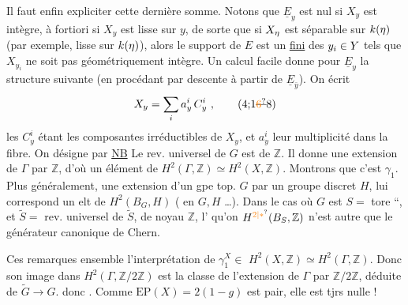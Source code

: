 Il faut enfin expliciter cette dernière somme. Notons que $\underline E_y$  est nul si $X_y$ est  intègre, à fortiori si $X_y$ est lisse sur $y$, de sorte que si $X_{\eta}$ est séparable sur $k(\eta)$ (par exemple, lisse sur $k(\eta)$), alors le support de $E$ est un  \uline{fini} des $y_i\in Y$ tels que $X_{y_i}$ ne soit pas géométriquement intègre. Un calcul facile donne pour $\underline E_y$ la structure suivante (en procédant par descente à partir de $\underline E_{\bar y}$). On écrit 
\[
X_y=\handwritten{\sum}_{i} a_y^i\,C_y^i\ ,
\tag*{(4;1\deleted{\unsure{6}}\handwritten8)}
\]
les $C_y^i$ étant les composantes irréductibles de $X_y$, et $a_y^i$ leur multiplicité dans la fibre. On désigne par
\uline{NB} Le rev. universel de $G$ est de  $\mathbb Z$. Il donne une extension  de $\Gamma$ par $\mathbb Z$, d'où un élément de $H^2(\Gamma,\mathbb Z)\simeq H^2(X,\mathbb Z)$. Montrons que c'est $\gamma_1$. Plus généralement,  une extension d'un gpe top. $G$ par un groupe discret $H$, lui correspond un elt de $H^2(B_G,H)$ ( en $G,H$ \ldots).
Dans le cas où $G$ est $S=$ tore ``, et $\widetilde S=$ rev. universel de $\widetilde S$, de noyau $\mathbb Z$, l' qu'on   $H^{\unsure{2|*}}(B_S,\mathbb Z)$ n'est autre que le générateur canonique de Chern.

Ces remarques ensemble   l'interprétation  de $\gamma_1^X\in$  $H^2(X,\mathbb Z)\simeq H^2(\Gamma,\mathbb Z)$. Donc son image dans $H^2(\Gamma,\mathbb Z/2\mathbb Z)$  est la classe de l'extension de $\Gamma$ par $\mathbb Z/2\mathbb Z$, déduite de $\widetilde G\longrightarrow G$.  donc   . Comme $\mathrm{EP}(X)=2(1-g)$ est pair, elle est tjrs nulle !

